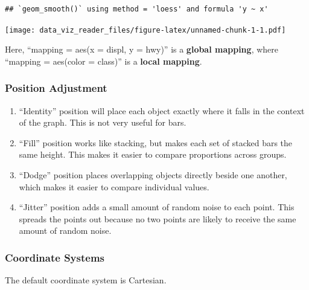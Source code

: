 \documentclass[]{book}
\providecommand{\tightlist}{%
  \setlength{\itemsep}{0pt}\setlength{\parskip}{0pt}}
\begin{document}
\begin{verbatim}
## `geom_smooth()` using method = 'loess' and formula 'y ~ x'
\end{verbatim}

\texttt{[image: data\_viz\_reader\_files/figure-latex/unnamed-chunk-1-1.pdf]}

Here, ``mapping = aes(x = displ, y = hwy)'' is a \textbf{global
mapping}, where ``mapping = aes(color = class)'' is a \textbf{local
mapping}.

\subsubsection{Position Adjustment}\label{position-adjustment}

\begin{enumerate}
\def\labelenumi{\alph{enumi})}
\tightlist
\item
  ``Identity'' position will place each object exactly where it falls in
  the context of the graph. This is not very useful for bars.
\item
  ``Fill'' position works like stacking, but makes each set of stacked
  bars the same height. This makes it easier to compare proportions
  across groups.
\item
  ``Dodge'' position places overlapping objects directly beside one
  another, which makes it easier to compare individual values.
\item
  ``Jitter'' position adds a small amount of random noise to each point.
  This spreads the points out because no two points are likely to
  receive the same amount of random noise.
\end{enumerate}

\subsubsection{Coordinate Systems}\label{coordinate-systems}

The default coordinate system is Cartesian.
\end{document}
